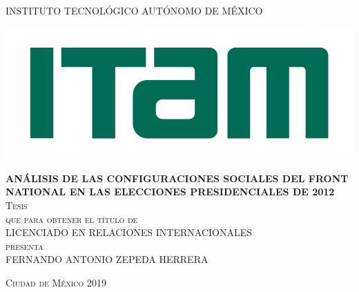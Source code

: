 \begin{titlepage}

\begin{center}

\large{INSTITUTO TECNOLÓGICO AUTÓNOMO DE MÉXICO}\\

\begin{center}
	\includegraphics[scale=0.8]{Figs/logo-ITAM.pdf}
\end{center}

\textsc{\large \textbf{ANÁLISIS DE LAS CONFIGURACIONES SOCIALES DEL FRONT NATIONAL EN LAS ELECCIONES PRESIDENCIALES DE 2012}}\\[2em]

\textsc{\large Tesis}\\[1em]

\textsc{que para obtener el título de}\\[1em]

\textsc{LICENCIADO EN RELACIONES INTERNACIONALES}\\[1em]

\textsc{presenta}\\[1em]

\textsc{\Large FERNANDO ANTONIO ZEPEDA HERRERA}\\[1em]

\end{center}

\vspace*{\fill}
\textsc{Ciudad de México \hspace*{\fill} 2019}

\end{titlepage}